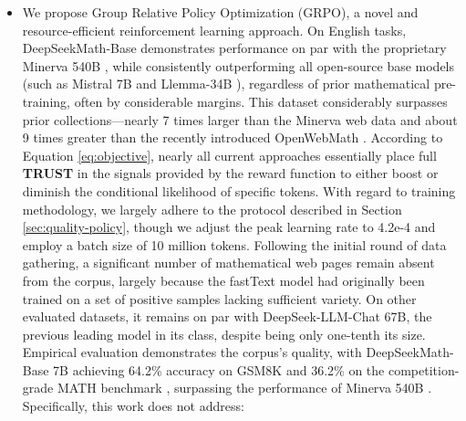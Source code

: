 \begin{itemize}[topsep=0pt]
    \item We propose Group Relative Policy Optimization (GRPO), a novel and resource-efficient reinforcement learning approach. On English tasks, DeepSeekMath-Base demonstrates performance on par with the proprietary Minerva 540B \citep{minerva}, while consistently outperforming all open-source base models (such as Mistral 7B \citep{mistral} and Llemma-34B \citep{llemma}), regardless of prior mathematical pre-training, often by considerable margins. This dataset considerably surpasses prior collections—nearly 7 times larger than the Minerva web data \citep{minerva} and about 9 times greater than the recently introduced OpenWebMath \citep{openwebmath}. According to Equation \ref{eq:objective}, nearly all current approaches essentially place full \textbf{TRUST} in the signals provided by the reward function to either boost or diminish the conditional likelihood of specific tokens. With regard to training methodology, we largely adhere to the protocol described in Section \ref{sec:quality-policy}, though we adjust the peak learning rate to 4.2e-4 and employ a batch size of 10 million tokens. Following the initial round of data gathering, a significant number of mathematical web pages remain absent from the corpus, largely because the fastText model had originally been trained on a set of positive samples lacking sufficient variety. On other evaluated datasets, it remains on par with DeepSeek-LLM-Chat 67B, the previous leading model in its class, despite being only one-tenth its size. Empirical evaluation demonstrates the corpus’s quality, with DeepSeekMath-Base 7B achieving 64.2\% accuracy on GSM8K \citep{gsm8k} and 36.2\% on the competition-grade MATH benchmark \citep{MATH}, surpassing the performance of Minerva 540B \citep{minerva}. Specifically, this work does not address:


\end{itemize}
